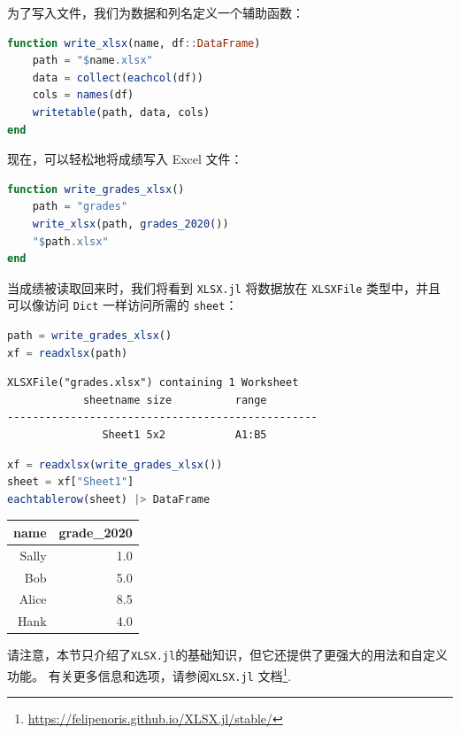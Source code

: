 \documentclass[
  notoc %
]{tufte-book}
\DeclareRobustCommand{\href}[2]{#2\footnote{\url{#1}}}
\newcommand{\passthrough}[1]{#1}
\begin{document}
为了写入文件，我们为数据和列名定义一个辅助函数：

\begin{lstlisting}[language=Julia]
function write_xlsx(name, df::DataFrame)
    path = "$name.xlsx"
    data = collect(eachcol(df))
    cols = names(df)
    writetable(path, data, cols)
end
\end{lstlisting}

现在，可以轻松地将成绩写入 Excel 文件：

\begin{lstlisting}[language=Julia]
function write_grades_xlsx()
    path = "grades"
    write_xlsx(path, grades_2020())
    "$path.xlsx"
end
\end{lstlisting}

当成绩被读取回来时，我们将看到 \passthrough{\lstinline!XLSX.jl!}
将数据放在 \passthrough{\lstinline!XLSXFile!} 类型中，并且可以像访问
\passthrough{\lstinline!Dict!} 一样访问所需的
\passthrough{\lstinline!sheet!}：

\begin{lstlisting}[language=Julia]
path = write_grades_xlsx()
xf = readxlsx(path)
\end{lstlisting}

\begin{lstlisting}[language=Output]
XLSXFile("grades.xlsx") containing 1 Worksheet
            sheetname size          range        
-------------------------------------------------
               Sheet1 5x2           A1:B5        

\end{lstlisting}

\begin{lstlisting}[language=Julia]
xf = readxlsx(write_grades_xlsx())
sheet = xf["Sheet1"]
eachtablerow(sheet) |> DataFrame
\end{lstlisting}

\begin{longtable}[]{@{}rr@{}}
\toprule
name & grade\_2020 \\
\midrule
\endhead
Sally & 1.0 \\
Bob & 5.0 \\
Alice & 8.5 \\
Hank & 4.0 \\
\bottomrule
\end{longtable}

请注意，本节只介绍了\passthrough{\lstinline!XLSX.jl!}的基础知识，但它还提供了更强大的用法和自定义功能。
有关更多信息和选项，请参阅\href{https://felipenoris.github.io/XLSX.jl/stable/}{\passthrough{\lstinline!XLSX.jl!}
文档}.
\end{document}
